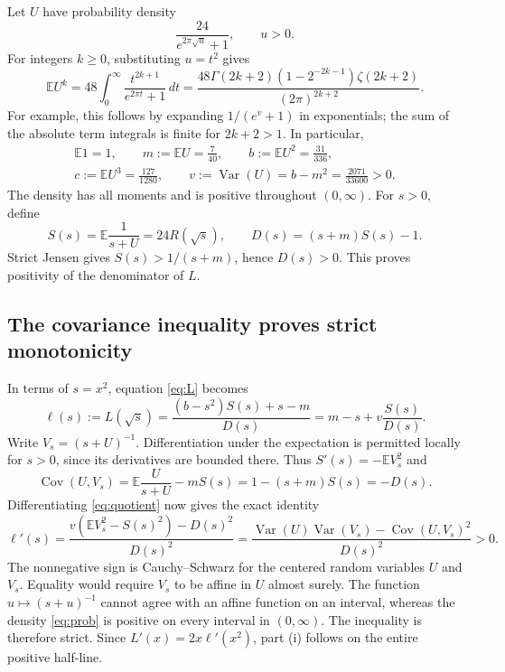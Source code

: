 \documentclass[11pt]{article}
\newcommand{\E}{\mathbb E}
\newcommand{\Var}{\operatorname{Var}}
\newcommand{\Cov}{\operatorname{Cov}}
\begin{document}
Let $U$ have probability density
\begin{equation}\label{eq:prob}
 \frac{24}{e^{2\pi\sqrt u}+1},\qquad u>0.
\end{equation}
For integers $k\geq0$, substituting $u=t^2$ gives
\[
 \E U^k=48\int_0^\infty\frac{t^{2k+1}}{e^{2\pi t}+1}\,dt
 =\frac{48\Gamma(2k+2)(1-2^{-2k-1})\zeta(2k+2)}{(2\pi)^{2k+2}}.
\]
For example, this follows by expanding $1/(e^v+1)$ in exponentials;
the sum of the absolute term integrals is finite for $2k+2>1$.
In particular,
\begin{equation}\label{eq:moments}
 \begin{gathered}
 \E 1=1,\qquad m:=\E U=\frac7{40},\qquad b:=\E U^2=\frac{31}{336},\\
 c:=\E U^3=\frac{127}{1280},\qquad
 v:=\Var(U)=b-m^2=\frac{2071}{33600}>0.
 \end{gathered}
\end{equation}
The density has all moments and is positive throughout $(0,\infty)$.
For $s>0$, define
\[
 S(s)=\E\frac1{s+U}=24R(\sqrt s),\qquad
 D(s)=(s+m)S(s)-1.
\]
Strict Jensen gives $S(s)>1/(s+m)$, hence $D(s)>0$.
This proves positivity of the denominator of $L$.

\subsection*{The covariance inequality proves strict monotonicity}
In terms of $s=x^2$, equation \eqref{eq:L} becomes
\begin{equation}\label{eq:quotient}
 \ell(s):=L(\sqrt s)
 =\frac{(b-s^2)S(s)+s-m}{D(s)}
 =m-s+v\frac{S(s)}{D(s)}.
\end{equation}
Write $V_s=(s+U)^{-1}$. Differentiation under the expectation is
permitted locally for $s>0$, since its derivatives are bounded there.
Thus $S'(s)=-\E V_s^2$ and
\[
 \Cov(U,V_s)=\E\frac{U}{s+U}-mS(s)=1-(s+m)S(s)=-D(s).
\]
Differentiating \eqref{eq:quotient} now gives the exact identity
\begin{equation}\label{eq:covariance}
 \ell'(s)=\frac{v(\E V_s^2-S(s)^2)-D(s)^2}{D(s)^2}
 =\frac{\Var(U)\Var(V_s)-\Cov(U,V_s)^2}{D(s)^2}>0.
\end{equation}
The nonnegative sign is Cauchy--Schwarz for the centered random
variables $U$ and $V_s$. Equality would require $V_s$ to be affine
in $U$ almost surely. The function $u\mapsto(s+u)^{-1}$ cannot agree
with an affine function on an interval, whereas the density
\eqref{eq:prob} is positive on every interval in $(0,\infty)$.
The inequality is therefore strict. Since $L'(x)=2x\ell'(x^2)$,
part (i) follows on the entire positive half-line.
\end{document}
